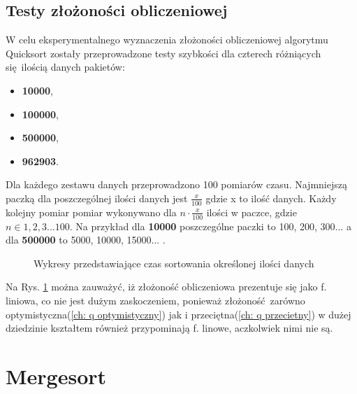 \documentclass[12pt]{article}
\begin{document}
\subsection{Testy złożoności obliczeniowej}
W celu eksperymentalnego wyznaczenia złożoności obliczeniowej algorytmu Quicksort zostały przeprowadzone testy szybkości dla 
czterech różniących się ilością danych pakietów: 
\begin{itemize}
       \item \textbf{10000},
       \item  \textbf{100000},
       \item \textbf{500000},
       \item \textbf{962903}.
\end{itemize}
Dla każdego zestawu danych przeprowadzono 100 pomiarów czasu. Najmniejszą paczką dla poszczególnej ilości danych jest 
$\frac{x}{100}$ gdzie x to ilość danych. Każdy kolejny pomiar pomiar wykonywano dla $n \cdot \frac{x}{100}$ ilości w paczce,
gdzie $n \in 1,2,3 ... 100$.
Na przykład dla \textbf{10000} poszczególne paczki to 100, 200, 300... a dla \textbf{500000} to 5000, 10000, 15000... .

\begin{figure}[H]
       \centering
       \quad
\end{figure}
\begin{figure}[H]\ContinuedFloat
       
       \quad
       \renewcommand{\figurename}{Wykres.}

       \caption{Wykresy przedstawiające czas sortowania określonej ilości danych}
       \label{fig: qsort}
\end{figure}

Na Rys. \ref{fig: qsort} można zauważyć, iż złożoność obliczeniowa prezentuje się jako f. liniowa,
co nie jest dużym zaskoczeniem, ponieważ złożoność zarówno optymistyczna(\ref{ch: q optymistyczny}) jak i przeciętna(\ref{ch: q przecietny}) w dużej dziedzinie kształtem 
również przypominają f. linowe, aczkolwiek nimi nie są.

\section{Mergesort}\label{ch: mergesort}
\end{document}
